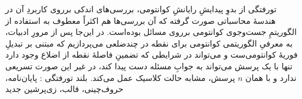 


\pagestyle{empty}

‌تورفتگی
از بدوِ پیدایشِ رایانشِ کوانتومی، بررسی‌های اندکی برروی کاربردِ 
آن در هندسهٔ محاسباتی صورت گرفته که آن بررسی‌ها هم اکثراً 
معطوف به استفاده از الگوریتمِ جست‌وجوی کوانتومی برروی مسائل بوده‌است.
در این‌جا پس از مرورِ ادبیات، به معرفیِ الگوریتمی کوانتومی برای 
نقطه در چندضلعی می‌پردازیم که مبتنی بر تبدیلِ فوریهٔ کوانتومی‌ست 
و می‌تواند در  شرایطی که تضمینِ فاصلهٔ نقطه از اضلاع وجود دارد تنها با یک 
پرسش می‌تواند به جوابِ مسئله دست پیدا کند، در غیر این صورت تسریعی
ندارد و با همان $n$ پرسش، مشابه حالت کلاسیک عمل می‌کند.
‌بلند
‌تورفتگی : 
پایان‌نامه، حروف‌چینی، قالب، زی‌پرشین
‌جدید

